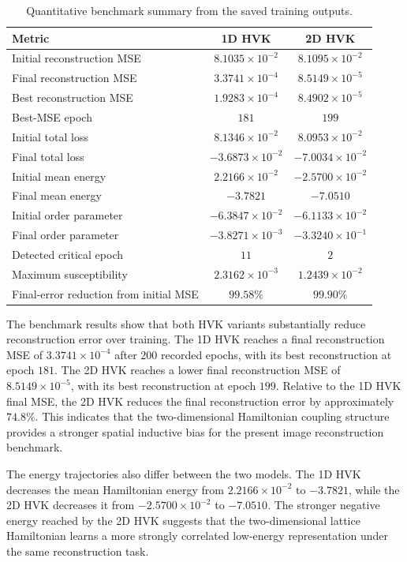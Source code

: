 \documentclass[11pt]{article}
\begin{document}
\begin{table}[h]
\centering
\caption{Quantitative benchmark summary from the saved training outputs.}
\begin{tabular}{lcc}
\toprule
Metric & 1D HVK & 2D HVK \\
\midrule
Initial reconstruction MSE & $8.1035\times 10^{-2}$ & $8.1095\times 10^{-2}$ \\
Final reconstruction MSE & $3.3741\times 10^{-4}$ & $8.5149\times 10^{-5}$ \\
Best reconstruction MSE & $1.9283\times 10^{-4}$ & $8.4902\times 10^{-5}$ \\
Best-MSE epoch & $181$ & $199$ \\
Initial total loss & $8.1346\times 10^{-2}$ & $8.0953\times 10^{-2}$ \\
Final total loss & $-3.6873\times 10^{-2}$ & $-7.0034\times 10^{-2}$ \\
Initial mean energy & $2.2166\times 10^{-2}$ & $-2.5700\times 10^{-2}$ \\
Final mean energy & $-3.7821$ & $-7.0510$ \\
Initial order parameter & $-6.3847\times 10^{-2}$ & $-6.1133\times 10^{-2}$ \\
Final order parameter & $-3.8271\times 10^{-3}$ & $-3.3240\times 10^{-1}$ \\
Detected critical epoch & $11$ & $2$ \\
Maximum susceptibility & $2.3162\times 10^{-3}$ & $1.2439\times 10^{-2}$ \\
Final-error reduction from initial MSE & $99.58\%$ & $99.90\%$ \\
\bottomrule
\end{tabular}
\end{table}

The benchmark results show that both HVK variants substantially reduce reconstruction error over training. The 1D HVK reaches a final reconstruction MSE of $3.3741\times 10^{-4}$ after $200$ recorded epochs, with its best reconstruction at epoch $181$. The 2D HVK reaches a lower final reconstruction MSE of $8.5149\times 10^{-5}$, with its best reconstruction at epoch $199$. Relative to the 1D HVK final MSE, the 2D HVK reduces the final reconstruction error by approximately $74.8\%$. This indicates that the two-dimensional Hamiltonian coupling structure provides a stronger spatial inductive bias for the present image reconstruction benchmark.

The energy trajectories also differ between the two models. The 1D HVK decreases the mean Hamiltonian energy from $2.2166\times 10^{-2}$ to $-3.7821$, while the 2D HVK decreases it from $-2.5700\times 10^{-2}$ to $-7.0510$. The stronger negative energy reached by the 2D HVK suggests that the two-dimensional lattice Hamiltonian learns a more strongly correlated low-energy representation under the same reconstruction task.
\end{document}
